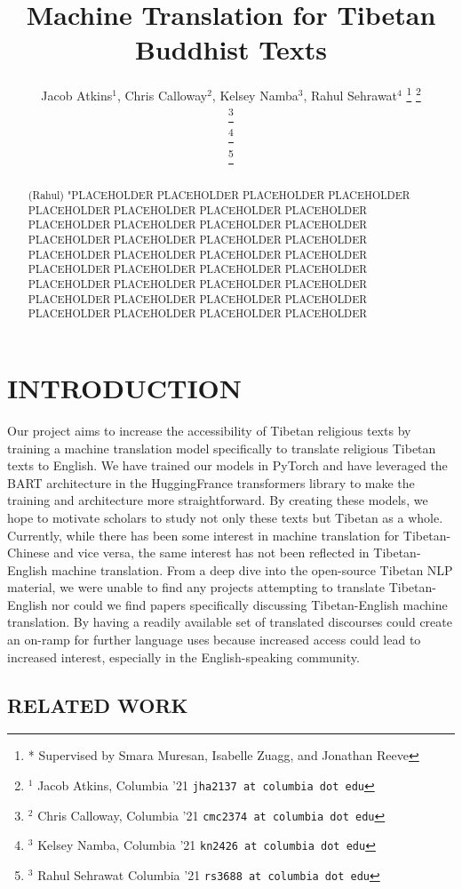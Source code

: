 \documentclass[letterpaper, 12 pt, conference]{ieeeconf}  %
\title{\LARGE \bf
Machine Translation for Tibetan Buddhist Texts
}
\author{ Jacob Atkins$^{1}$, Chris Calloway$^{2}$, Kelsey Namba$^{3}$, Rahul Sehrawat$^{4}$%
\thanks{* Supervised by Smara Muresan, Isabelle Zuagg, and Jonathan Reeve}%
\thanks{$^{1}$ Jacob Atkins, Columbia '21
        {\tt\small jha2137 at columbia dot edu}}%
        
\thanks{$^{2}$ Chris Calloway, Columbia '21
        {\tt\small cmc2374 at columbia dot edu}}%
        
\thanks{$^{3}$ Kelsey Namba, Columbia '21
        {\tt\small kn2426 at columbia dot edu}}%
        
        
\thanks{$^{3}$ Rahul Sehrawat Columbia '21
        {\tt\small rs3688 at columbia dot edu}}%





}
\begin{document}
\maketitle
\thispagestyle{empty}
\pagestyle{empty}


\begin{abstract}

(Rahul) "PLACEHOLDER PLACEHOLDER PLACEHOLDER PLACEHOLDER PLACEHOLDER PLACEHOLDER PLACEHOLDER PLACEHOLDER PLACEHOLDER PLACEHOLDER PLACEHOLDER
PLACEHOLDER PLACEHOLDER PLACEHOLDER PLACEHOLDER PLACEHOLDER
PLACEHOLDER PLACEHOLDER PLACEHOLDER PLACEHOLDER PLACEHOLDER
PLACEHOLDER PLACEHOLDER PLACEHOLDER PLACEHOLDER PLACEHOLDER
PLACEHOLDER PLACEHOLDER PLACEHOLDER PLACEHOLDER PLACEHOLDER
PLACEHOLDER PLACEHOLDER PLACEHOLDER PLACEHOLDER PLACEHOLDER


\end{abstract}


\section{INTRODUCTION}

Our project aims to increase the accessibility of Tibetan religious texts by training a machine translation model specifically to translate religious Tibetan texts to English. We have trained our models in PyTorch and have leveraged the BART architecture in the HuggingFrance transformers library to make the training and architecture more straightforward. By creating these models, we hope to motivate scholars to study not only these texts but Tibetan as a whole. Currently, while there has been some interest in machine translation for Tibetan-Chinese and vice versa, the same interest has not been reflected in Tibetan-English machine translation. From a deep dive into the open-source Tibetan NLP material, we were unable to find any projects attempting to translate Tibetan-English nor could we find papers specifically discussing Tibetan-English machine translation. By having a readily available set of translated discourses could create an on-ramp for further language uses because increased access could lead to increased interest, especially in the English-speaking community.

\subsection{RELATED WORK}
\end{document}

